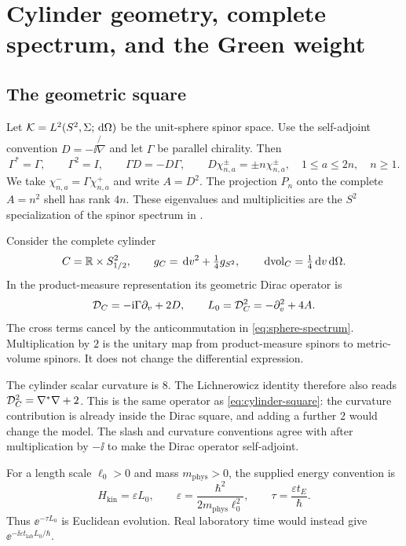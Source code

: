 \section{Cylinder geometry, complete spectrum, and the Green weight}
\label{sec:geometry}

\subsection{The geometric square}

Let $\mathcal K=L^2(S^2,\Sigma;\,\mathrm d\Omega)$ be the unit-sphere spinor space.
Use the self-adjoint convention $D=-\ii\not{\nabla}$ and let
$\Gamma$ be parallel chirality. Then
\begin{equation}
 \Gamma^*=\Gamma,\qquad \Gamma^2=I,\qquad
 \Gamma D=-D\Gamma,
 \qquad D\chi_{n,a}^{\pm}=\pm n\chi_{n,a}^{\pm},
 \quad 1\le a\le2n,\quad n\ge1.
 \label{eq:sphere-spectrum}
\end{equation}
We take $\chi^-_{n,a}=\Gamma\chi^+_{n,a}$ and write $A=D^2$.
The projection $P_n$ onto the complete $A=n^2$ shell has rank $4n$.
These eigenvalues and multiplicities are the $S^2$ specialization of the
spinor spectrum in \cite[eqs.~(3.40), (3.54)]{CamporesiHiguchi1996}.

Consider the complete cylinder
\begin{equation}
 C=\mathbb R\times S^2_{1/2},\qquad
 g_C=\,\mathrm d v^2+\tfrac14g_{S^2},\qquad
 \,\mathrm d\mathrm{vol}_C=\tfrac14\,\mathrm d v\,\mathrm d\Omega.
\end{equation}
In the product-measure representation its geometric Dirac operator is
\begin{equation}
 \mathcal D_C=-\mathrm i\Gamma\partial_v+2D,
 \qquad L_0=\mathcal D_C^2=-\partial_v^2+4A.
 \label{eq:cylinder-square}
\end{equation}
The cross terms cancel by the anticommutation in
\eqref{eq:sphere-spectrum}. Multiplication by $2$ is the unitary map from
product-measure spinors to metric-volume spinors. It does not change the
differential expression.

The cylinder scalar curvature is $8$. The Lichnerowicz identity therefore
also reads $\mathcal D_C^2=\nabla^*\nabla+2$. This is the same operator as
\eqref{eq:cylinder-square}: the curvature contribution is already inside
the Dirac square, and adding a further $2$ would change the model.
The slash and curvature conventions agree with
\cite[eqs.~(5.35)--(5.36)]{CamporesiHiguchi1996} after multiplication by
$-\ii$ to make the Dirac operator self-adjoint.

For a length scale $\ell_0>0$ and mass $m_{\mathrm{phys}}>0$, the supplied
energy convention is
\begin{equation}
 H_{\mathrm{kin}}=\varepsilon L_0,
 \qquad \varepsilon=\frac{\hbar^2}{2m_{\mathrm{phys}}\ell_0^2},
 \qquad \tau=\frac{\varepsilon t_E}{\hbar}.
 \label{eq:physical-scale}
\end{equation}
Thus $\ee^{-\tau L_0}$ is Euclidean evolution. Real laboratory time would
instead give $\ee^{-\ii\varepsilon t_{\mathrm{lab}}L_0/\hbar}$.

